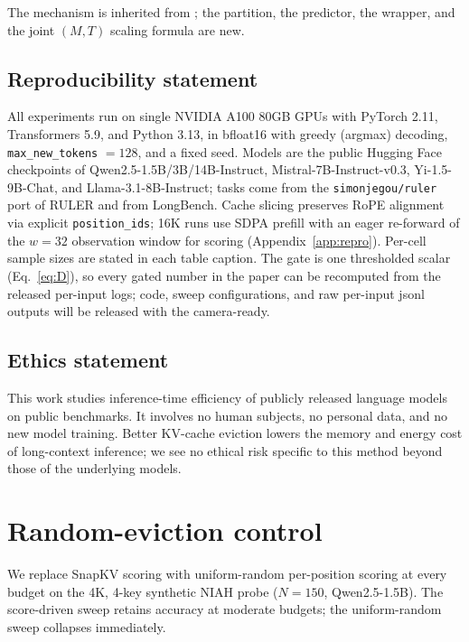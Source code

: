 \documentclass{article} %
\begin{document}
The mechanism is inherited from \citet{arxiv260509649}; the partition,
the predictor, the wrapper, and the joint $(M, T)$ scaling formula are
new.

\subsection*{Reproducibility statement}

All experiments run on single NVIDIA A100 80GB GPUs with PyTorch 2.11,
Transformers 5.9, and Python 3.13, in bfloat16 with greedy (argmax)
decoding, \texttt{max\_new\_tokens} $= 128$, and a fixed seed. Models
are the public Hugging Face checkpoints of Qwen2.5-1.5B/3B/14B-Instruct,
Mistral-7B-Instruct-v0.3, Yi-1.5-9B-Chat, and Llama-3.1-8B-Instruct;
tasks come from the \texttt{simonjegou/ruler} port of RULER and from
LongBench. Cache slicing preserves RoPE alignment via explicit
\texttt{position\_ids}; 16K runs use SDPA prefill with an eager
re-forward of the $w = 32$ observation window for scoring
(Appendix~\ref{app:repro}). Per-cell sample sizes are stated in each
table caption. The gate is one thresholded scalar (Eq.~\eqref{eq:D}),
so every gated number in the paper can be recomputed from the released
per-input logs; code, sweep configurations, and raw per-input jsonl
outputs will be released with the camera-ready.

\subsection*{Ethics statement}

This work studies inference-time efficiency of publicly released
language models on public benchmarks. It involves no human subjects,
no personal data, and no new model training. Better KV-cache eviction
lowers the memory and energy cost of long-context inference; we see no
ethical risk specific to this method beyond those of the underlying
models.




\appendix

\section{Random-eviction control}
\label{app:random}

We replace SnapKV scoring with uniform-random per-position scoring at every
budget on the 4K, 4-key synthetic NIAH probe ($N = 150$, Qwen2.5-1.5B). The
score-driven sweep retains accuracy at moderate budgets; the uniform-random
sweep collapses immediately.
\end{document}
